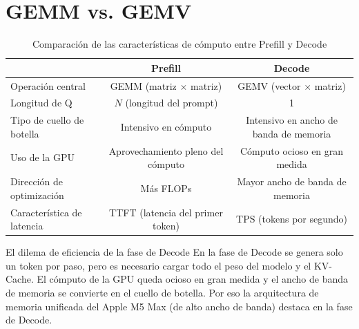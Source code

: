 \section{GEMM vs. GEMV}

\begin{table}[H]
\centering
\caption{Comparación de las características de cómputo entre Prefill y Decode}
\begin{tabular}{lcc}
\toprule
& \textbf{Prefill} & \textbf{Decode} \\
\midrule
Operación central & GEMM (matriz $\times$ matriz) & GEMV (vector $\times$ matriz) \\
Longitud de Q & $N$ (longitud del prompt) & 1 \\
Tipo de cuello de botella & Intensivo en cómputo & Intensivo en ancho de banda de memoria \\
Uso de la GPU & Aprovechamiento pleno del cómputo & Cómputo ocioso en gran medida \\
Dirección de optimización & Más FLOPs & Mayor ancho de banda de memoria \\
Característica de latencia & TTFT (latencia del primer token) & TPS (tokens por segundo) \\
\bottomrule
\end{tabular}
\end{table}

\begin{warningbox}{El dilema de eficiencia de la fase de Decode}
En la fase de Decode se genera solo un token por paso, pero es necesario cargar todo el peso del modelo y el KV-Cache. El cómputo de la GPU queda ocioso en gran medida y el ancho de banda de memoria se convierte en el cuello de botella. Por eso la arquitectura de memoria unificada del Apple M5 Max (de alto ancho de banda) destaca en la fase de Decode.
\end{warningbox}
